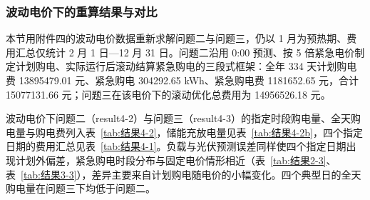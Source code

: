 
\subsubsection{波动电价下的重算结果与对比}

本节用附件四的波动电价数据重新求解问题二与问题三，仍以 1 月为预热期、费用汇总仅统计 2 月 1 日—12 月 31 日。问题二沿用 0:00 预测、按 5 倍紧急电价制定计划购电、实际运行后滚动结算紧急购电的三段式框架：全年 334 天计划购电费 13895479.01 元、紧急购电 304292.65 kWh、紧急购电费 1181652.65 元，合计 15077131.66 元；问题三在该电价下的滚动优化总费用为 14956526.18 元。

波动电价下问题二（result4-2）与问题三（result4-3）的指定时段购电量、全天购电量与购电费列入表~\ref{tab:结果4-2}，储能充放电量见表~\ref{tab:结果4-2b}，四个指定日期的费用汇总见表~\ref{tab:结果4-1}。负载与光伏预测误差同样使四个指定日期出现计划外偏差，紧急购电时段分布与固定电价情形相近（表~\ref{tab:结果2-3}、表~\ref{tab:结果3-3}），差异主要来自计划购电随电价的小幅变化。四个典型日的全天购电量在问题三下均低于问题二。

